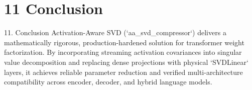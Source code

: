 \section{11 Conclusion}

 11. Conclusion
Activation-Aware SVD (`aa\_svd\_compressor`) delivers a mathematically rigorous, production-hardened solution for transformer weight factorization. By incorporating streaming activation covariances into singular value decomposition and replacing dense projections with physical `SVDLinear` layers, it achieves reliable parameter reduction and verified multi-architecture compatibility across encoder, decoder, and hybrid language models.
